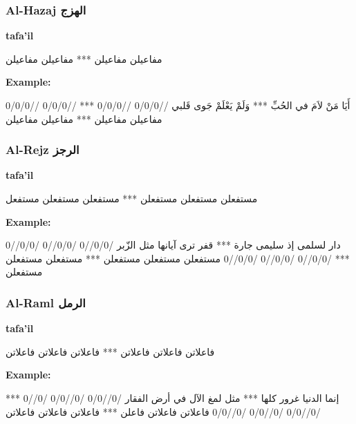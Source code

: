 
\subsubsection{Al-Hazaj \textarabic{الهزج}}
\textbf{tafa'il}
\begin{Arabic}
	\begin{traditionalpoem*}
مفاعيلن مفاعيلن *** مفاعيلن مفاعيلن
	\end{traditionalpoem*}
      \end{Arabic}
\textbf{Example:}
\begin{Arabic}
	\begin{traditionalpoem*}
          أَيَا مَنْ لاَمَ في الحُبِّ *** وَلَمْ يَعْلَمْ جَوى قَلبي
          //0/0/0 //0/0/0 *** //0/0/0 //0/0/0
          مفاعيلن مفاعيلن *** مفاعيلن مفاعيلن
	\end{traditionalpoem*}
      \end{Arabic}
\subsubsection{Al-Rejz \textarabic{الرجز}}
\textbf{tafa'il}

\begin{Arabic}
  \begin{traditionalpoem*}
    مستفعلن مستفعلن مستفعلن *** مستفعلن مستفعلن مستفعل
	\end{traditionalpoem*}
      \end{Arabic}
\textbf{Example:}
\begin{Arabic}
  \begin{traditionalpoem*}
    دار لسلمى إذ سليمى جارة *** قفر ترى آيانها مثل الزّبر
    /0/0//0 /0/0//0 /0/0//0 *** /0/0//0 /0/0//0 /0/0//0
مستفعلن مستفعلن مستفعلن *** مستفعلن مستفعلن مستفعلن
	\end{traditionalpoem*}
      \end{Arabic}
\subsubsection{Al-Raml \textarabic{الرمل}}
\textbf{tafa'il}

\begin{Arabic}
  \begin{traditionalpoem*}
    فاعلاتن فاعلاتن فاعلاتن *** فاعلاتن فاعلاتن فاعلاتن
	\end{traditionalpoem*}
      \end{Arabic}
\textbf{Example:}
\begin{Arabic}
  \begin{traditionalpoem*}
    إنما الدنيا غرور كلها *** مثل لمغ اﻵل في أرض الفقار
    /0//0/0 /0//0/0 /0//0 *** /0//0/0 /0//0/0 /0//0/0
    فاعلاتن فاعلاتن فاعلن *** فاعلاتن فاعلاتن فاعلاتن
\end{traditionalpoem*}
\end{Arabic}
